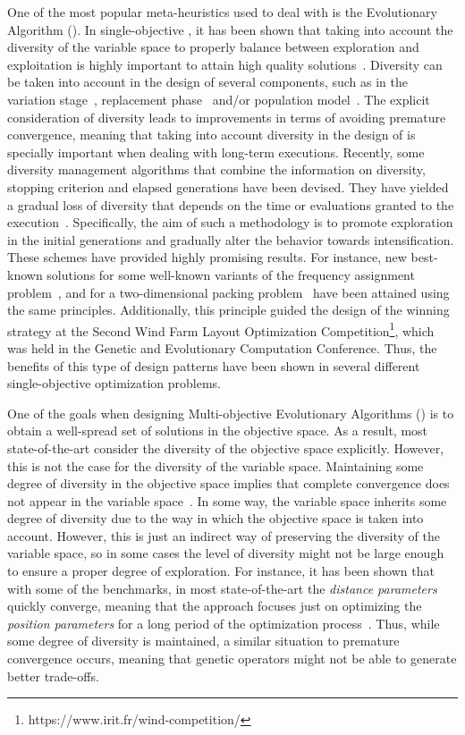 One of the most popular meta-heuristics used to deal with \MOPS{} is the Evolutionary Algorithm (\EA{}).
%
In single-objective \EAS{}, it has been shown that taking into account the diversity of the variable space
to properly balance between exploration and exploitation is highly important to attain high quality 
solutions~\cite{Joel:BALANCE_DIVERSITY}.
%
Diversity can be taken into account in the design of several components, such as in the variation 
stage~\cite{Joel:FUZZY_ADAPTIVE_GA,Joel:CROSSOVER_DIVERSITY}, replacement phase~\cite{Joel:MULTI_DYNAMIC} 
and/or population model~\cite{Joel:SAWTOOTH}.
%
The explicit consideration of diversity leads to improvements in terms of avoiding premature convergence, 
meaning that taking into account diversity in the design of \EAS{} is specially important when dealing 
with long-term executions.
%
Recently, some diversity management algorithms that combine the information on diversity, stopping criterion and elapsed 
generations have been devised.
%
They have yielded a gradual loss of diversity that depends on the time or evaluations granted to the 
execution~\cite{Joel:MULTI_DYNAMIC}.
%
Specifically, the aim of such a methodology is to promote exploration in the initial generations and gradually alter the 
behavior towards intensification.
%
These schemes have provided highly promising results.
%
For instance, new best-known solutions for some well-known variants of the frequency assignment problem~\cite{Segura:17},
and for a two-dimensional packing problem~\cite{Joel:MULTI_DYNAMIC} have been attained using the same principles.
%
Additionally, this principle guided the design of the winning strategy at the Second Wind Farm Layout Optimization 
Competition\footnote{https://www.irit.fr/wind-competition/}, which was held in the Genetic and Evolutionary 
Computation Conference.
%
Thus, the benefits of this type of design patterns have been shown in several different single-objective optimization problems.

One of the goals when designing Multi-objective Evolutionary Algorithms (\MOEAS{}) is to obtain a well-spread 
set of solutions in the objective space.
%
As a result, most state-of-the-art \MOEAS{} consider the diversity of the objective space explicitly.
%
However, this is not the case for the diversity of the variable space.
%
Maintaining some degree of diversity in the objective space implies that complete convergence 
does not appear in the variable space~\cite{Joel:GDE3_CEC09}.
%
In some way, the variable space inherits some degree of diversity due to the way in which the objective space is 
taken into account. 
%
However, this is just an indirect way of preserving the diversity of the variable space, so 
in some cases the level of diversity might not be large enough to ensure a proper degree of exploration.
%
For instance, it has been shown that with some of the \WFG{} benchmarks, in most state-of-the-art \MOEAS{} 
the \textit{distance parameters} quickly converge, meaning that the approach focuses just on optimizing the 
\textit{position parameters} for a long period of the optimization process~\cite{Joel:GDE3_CEC09}.
%
Thus, while some degree of diversity is maintained, a similar situation to premature convergence occurs,
meaning that genetic operators might not be able to generate better trade-offs. 

